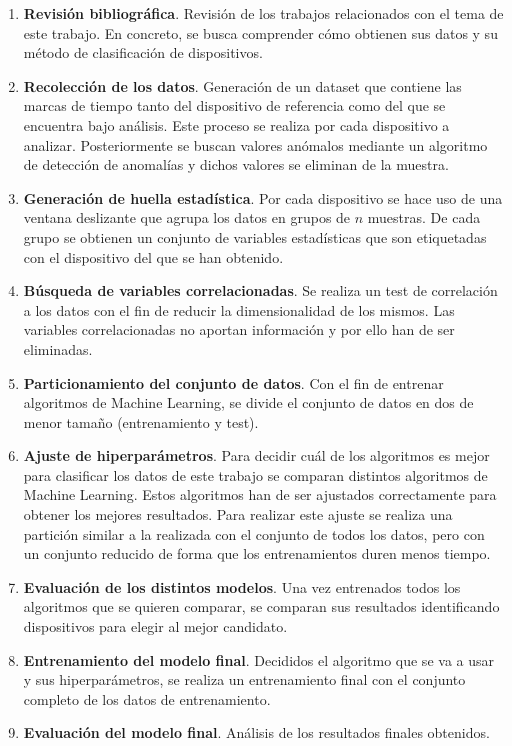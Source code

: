 \begin{enumerate}
    \item \textbf{Revisión bibliográfica}. Revisión de los trabajos relacionados con el tema de este trabajo. En concreto, se busca comprender cómo obtienen sus datos y su método de clasificación de dispositivos.
    \item \textbf{Recolección de los datos}. Generación de un dataset que contiene las marcas de tiempo tanto del dispositivo de referencia como del que se encuentra bajo análisis. Este proceso se realiza por cada dispositivo a analizar. Posteriormente se buscan valores anómalos mediante un algoritmo de detección de anomalías y dichos valores se eliminan de la muestra.
    \item \textbf{Generación de huella estadística}. Por cada dispositivo se hace uso de una ventana deslizante que agrupa los datos en grupos de $n$ muestras. De cada grupo se obtienen un conjunto de variables estadísticas que son etiquetadas con el dispositivo del que se han obtenido.
    \item \textbf{Búsqueda de variables correlacionadas}. Se realiza un test de correlación a los datos con el fin de reducir la dimensionalidad de los mismos. Las variables correlacionadas no aportan información y por ello han de ser eliminadas.
    \item \textbf{Particionamiento del conjunto de datos}. Con el fin de entrenar algoritmos de Machine Learning, se divide el conjunto de datos en dos de menor tamaño (entrenamiento y test).
    \item \textbf{Ajuste de hiperparámetros}. Para decidir cuál de los algoritmos es mejor para clasificar los datos de este trabajo se comparan distintos algoritmos de Machine Learning. Estos algoritmos han de ser ajustados correctamente para obtener los mejores resultados. Para realizar este ajuste se realiza una partición similar a la realizada con el conjunto de todos los datos, pero con un conjunto reducido de forma que los entrenamientos duren menos tiempo.
    \item \textbf{Evaluación de los distintos modelos}. Una vez entrenados todos los algoritmos que se quieren comparar, se comparan sus resultados identificando dispositivos para elegir al mejor candidato.
    \item \textbf{Entrenamiento del modelo final}. Decididos el algoritmo que se va a usar y sus hiperparámetros, se realiza un entrenamiento final con el conjunto completo de los datos de entrenamiento.
    \item \textbf{Evaluación del modelo final}. Análisis de los resultados finales obtenidos.
\end{enumerate}
